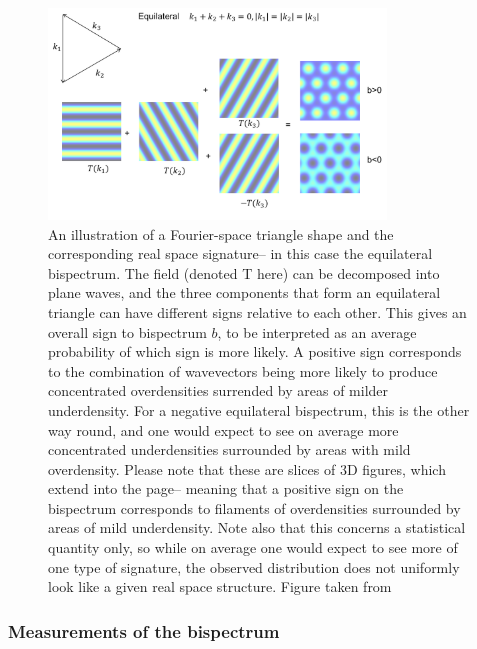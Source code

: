 \begin{figure}[ht!]
	\centering
	\includegraphics[width=0.8\textwidth]{fig/Equilateral.png}
	\caption{An illustration of a Fourier-space triangle shape and the corresponding real space signature-- in this case the equilateral bispectrum. The field (denoted T here) can be decomposed into plane waves, and the three components that form an equilateral triangle can have different signs relative to each other. This gives an overall sign to bispectrum $b$, to be interpreted as an average probability of which sign is more likely. A positive sign corresponds to the combination of wavevectors being more likely to produce concentrated overdensities surrended by areas of milder underdensity. For a negative equilateral bispectrum, this is the other way round, and one would expect to see on average more concentrated underdensities surrounded by areas with mild overdensity. Please note that these are slices of 3D figures, which extend into the page-- meaning that a positive sign on the bispectrum corresponds to filaments of overdensities surrounded by areas of mild underdensity. Note also that this concerns a statistical quantity only, so while on average one would expect to see more of one type of signature, the observed distribution does not uniformly look like a given real space structure. Figure taken from~\cite{Lewis:2011}}
	\label{fig:realspacesignature}
\end{figure}



\subsubsection{Measurements of the bispectrum}

